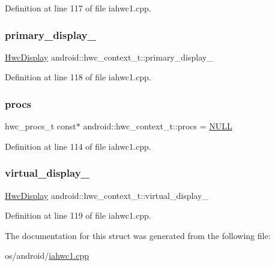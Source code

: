 Definition at line 117 of file iahwc1.\+cpp.

\mbox{\label{structandroid_1_1hwc__context__t_ab4808690795b2de67cad626a470bf73f}} 
\subsubsection{\texorpdfstring{primary\+\_\+display\+\_\+}{primary\_display\_}}
{\footnotesize\ttfamily \mbox{\hyperlink{structandroid_1_1HwcDisplay}{Hwc\+Display}} android\+::hwc\+\_\+context\+\_\+t\+::primary\+\_\+display\+\_\+}



Definition at line 118 of file iahwc1.\+cpp.

\mbox{\label{structandroid_1_1hwc__context__t_a6c22dd3733a9036176987ae60f925c72}} 
\subsubsection{\texorpdfstring{procs}{procs}}
{\footnotesize\ttfamily hwc\+\_\+procs\+\_\+t const$\ast$ android\+::hwc\+\_\+context\+\_\+t\+::procs = \mbox{\hyperlink{alios_2platformdefines_8h_a070d2ce7b6bb7e5c05602aa8c308d0c4}{N\+U\+LL}}}



Definition at line 114 of file iahwc1.\+cpp.

\mbox{\label{structandroid_1_1hwc__context__t_aec682e5272f36dfe59e6a03c7242022a}} 
\subsubsection{\texorpdfstring{virtual\+\_\+display\+\_\+}{virtual\_display\_}}
{\footnotesize\ttfamily \mbox{\hyperlink{structandroid_1_1HwcDisplay}{Hwc\+Display}} android\+::hwc\+\_\+context\+\_\+t\+::virtual\+\_\+display\+\_\+}



Definition at line 119 of file iahwc1.\+cpp.



The documentation for this struct was generated from the following file\+:\begin{DoxyCompactItemize}
\item 
os/android/\mbox{\hyperlink{iahwc1_8cpp}{iahwc1.\+cpp}}\end{DoxyCompactItemize}
